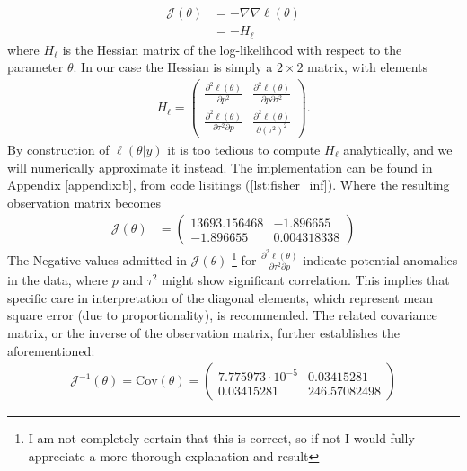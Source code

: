 \begin{align*}
    \mathcal{J}(\theta) &= -\nabla \nabla \ell(\theta) \\[5pt]
    &= - H_{\ell}
\end{align*}
where $H_{\ell}$ is the Hessian matrix of the log-likelihood with respect to the parameter $\theta$. In our case the Hessian is simply a $2 \times 2$ matrix, with elements 
\begin{align}
    H_{\ell} = \begin{pmatrix}
                        \frac{\partial^2 \ell(\theta)}{\partial p^2} &  \frac{\partial^2 \ell(\theta)}{\partial p \partial \tau^2} \\[7pt]
                         \frac{\partial^2 \ell(\theta)}{\partial \tau^2 \partial p} & \frac{\partial^2 \ell(\theta)}{\partial (\tau^2)^2}
                \end{pmatrix}.
\end{align}
By construction of $\ell(\theta|y)$ it is too tedious to compute $H_{\ell}$ analytically, and we will numerically approximate it instead. The implementation can be found in Appendix \ref{appendix:b}, from code lisitings (\ref{lst:fisher_inf}). Where the resulting observation matrix becomes 
\begin{align*}
     \mathcal{J}(\theta) &= \begin{pmatrix}
          13693.156468 & -1.896655 \\[5pt]
          -1.896655  & 0.004318338
     \end{pmatrix}
\end{align*}
The Negative values admitted in \( \mathcal{J}(\theta) \) \footnote{I am not completely certain that this is correct, so if not I would fully appreciate a more thorough explanation and result} for \( \frac{\partial^2 \ell(\theta)}{\partial \tau^2 \partial p} \) indicate potential anomalies in the data, where \( p \) and \( \tau^2 \) might show significant correlation. This implies that specific care in interpretation of the diagonal elements, which represent mean square error (due to proportionality), is recommended. \spaze
The related covariance matrix, or the inverse of the observation matrix, further establishes the aforementioned: 
\begin{align*}
    \mathcal{J}^{-1}(\theta) = \text{Cov}(\theta) = \begin{pmatrix}
          7.775973 \cdot 10^{-5} & 0.03415281 \\[5pt]
          0.03415281  & 246.57082498
     \end{pmatrix}
\end{align*}
